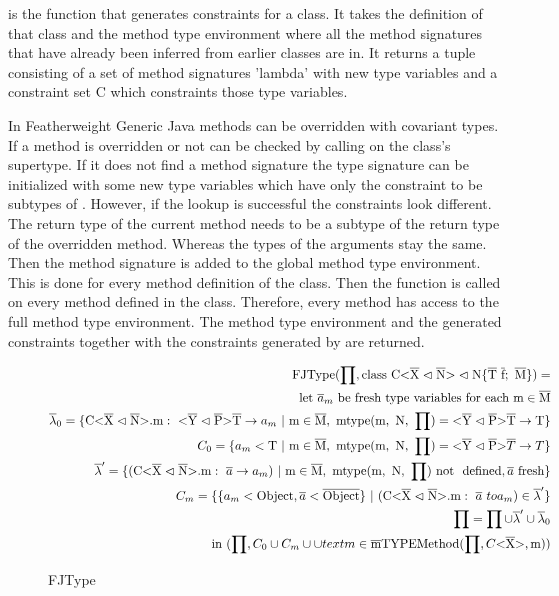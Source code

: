  is the function that generates constraints for a class. It takes the definition of that class and the method type environment where all the method signatures that have already been inferred from earlier classes are in.
It returns a tuple consisting of a set of method signatures 'lambda' with new type variables and a constraint set C which constraints those type variables.

In Featherweight Generic Java methods can be overridden with covariant types. If a method is overridden or not can be checked by calling  on the class's supertype.
If it does not find a method signature the type signature can be initialized with some new type variables which have only the constraint to be subtypes of .
However, if the  lookup is successful the constraints look different. The return type of the current method needs to be a subtype of the return type of the overridden method.
Whereas the types of the arguments stay the same. Then the method signature is added to the global method type environment.
This is done for every method definition of the class. Then the  function is called on every method defined in the class. Therefore, every method has access to the full method type environment.
The method type environment and the generated constraints together with the constraints generated by  are returned.

\begin{figure}[H]
    \begin{align*}
        \text{FJType}(\prod, \classheader \{ \ot{T} \ \ot{f}; \ \ot{M} \}) = \\
        \text{let} \ \overline{a}_m \ \text{be fresh type variables for each m} \in \ot{M} \\
        \overline{\lambda}_0 = \{\cm : \ \yp \ot{T} \to a_m \ | \ \text{m} \in \ot{M}, \ \mtype = \yp \ot{T} \to \text{T} \}\\
        C_0 = \{ a_m < \text{T} \ | \ \text{m} \in \ot{M}, \ \mtype = \yp \oto{T} \}\\
        \overline{\lambda}' = \{ ( \cm : \ \overline{a} \to a_m ) \ | \ \text{m} \in \ot{M}, \ \mtype \ \text{not \ defined}, \fresh{\overline{a}} \}\\
        C_m = \{\{ a_m < \text{Object}, \overline{a} < \ot{Object} \} \ | \ ( \cm : \ \overline{a} \ to a_m) \in \overline{\lambda}' \} \\
        \prod = \prod \cup \overline{\lambda}' \cup \overline{\lambda}_0\\
        \text{in} \ (\prod, C_0 \cup C_m \cup \cup{text{m} \in \ot{m}} \text{TYPEMethod}(\prod, C \vv{\ot{X}}, \text{m}))
    \end{align*}
    \caption{FJType}
    \label{fjtype}
\end{figure}

